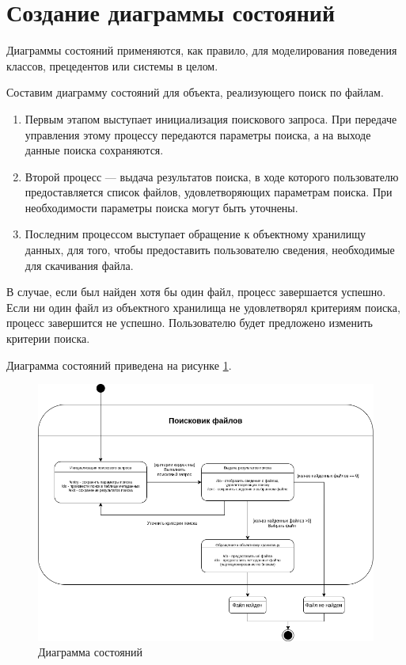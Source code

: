 \documentclass[a4paper,14pt]{extarticle}
\begin{document}
\newpage
\section{Создание диаграммы состояний}

Диаграммы состояний применяются, как правило, для моделирования
поведения классов, прецедентов или системы в целом.

Составим диаграмму состояний для объекта, реализующего поиск по файлам. 

\begin{enumerate}
	\item Первым этапом выступает инициализация поискового запроса. При передаче управления этому процессу передаются параметры поиска, а на выходе данные поиска сохраняются. 
	\item Второй процесс --- выдача результатов поиска, в ходе которого пользователю предоставляется список файлов, удовлетворяющих параметрам поиска. При необходимости параметры поиска могут быть уточнены. 
	\item Последним процессом выступает обращение к объектному хранилищу данных, для того, чтобы предоставить пользователю сведения, необходимые для скачивания файла. 
\end{enumerate}

В случае, если был найден хотя бы один файл, процесс завершается успешно. Если ни один файл из объектного хранилища не удовлетворял критериям поиска, процесс завершится не успешно. Пользователю будет предложено изменить критерии поиска. 

Диаграмма состояний приведена на рисунке \ref{fig:statechart}.

\begin{figure}[h!]
	\centering
	\includegraphics[width=0.6\linewidth]{images/statechart}
	\caption{Диаграмма состояний}
	\label{fig:statechart}
\end{figure}
\end{document}
